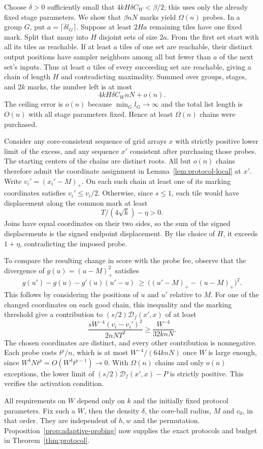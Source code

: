 Choose \(\delta>0\) sufficiently small that
\(4kH\delta C_W<\beta/2\); this uses only the already fixed stage
parameters. We show that \(\beta nN\) marks yield \(\Omega(n)\) probes.
In a group \(G\), put \(a=\lceil\delta l_G\rceil\). Suppose at least
\(2Ha\) remaining tiles have one fixed mark. Split that many into \(H\)
disjoint sets of size \(2a\). From the first set start with all its
tiles as reachable. If at least \(a\) tiles of one set are reachable,
their distinct output positions have sampler neighbors among all but
fewer than \(a\) of the next set's inputs. Thus at least \(a\) tiles of
every succeeding set are reachable, giving a chain of length \(H\)
and contradicting maximality. Summed over groups, stages, and \(2k\) marks,
the number left is at most
\[
                 4kH\delta C_W nN+o(n).
\]
The ceiling error is \(o(n)\) because \(\min_G l_G\to\infty\) and the total
list length is \(O(n)\) with all stage parameters fixed. Hence at least
\(\Omega(n)\) chains were purchased.

Consider any core-consistent sequence of grid arrays \(x\) with strictly
positive lower limit of the excess, and any sequence \(x'\) consistent
after purchasing those probes. The starting centers of the chains are
distinct roots. All but \(o(n)\) chains therefore admit the coordinate
assignment in Lemma~\ref{lem:protocol-local} at \(x'\). Write
\(v_i'=(x_i'-M)_+\). On each such chain at least one of its marking
coordinates satisfies \(v_i'\le v_i/2\). Otherwise, since \(s\le1\), each
tile would have displacement along the common mark at least
\[
                    T/(4\sqrt{k})-\eta>0 .
\]
Joins have equal coordinates on their two sides, so the sum of the
signed displacements is the signed endpoint displacement. By the choice of \(H\), it exceeds \(1+\eta\), contradicting the imposed probe.

To compare the resulting change in score with the probe fee, observe
that the divergence of $g(u)=(u-M)_+^2$ satisfies
\[
 g(u')-g(u)-g'(u)(u'-u)
        \ \ge\ \big((u'-M)_+-(u-M)_+\big)^2.
\]
This follows by considering the positions of $u$ and $u'$ relative to $M$.
For one of the changed coordinates on each good chain, this inequality
and the marking threshold give a contribution to
\((s/2)\mathcal D_f(x',x)\) of at least
\[
      \frac{sW^{-4}(v_i-v_i')^2}{2nNT^2}
                \ge \frac{W^{-4}}{32k nN}.
\]
The chosen coordinates are distinct, and every other contribution is
nonnegative. Each probe costs \( t^p/n\), which is at most
\(W^{-4}/(64k nN)\) once \(W\) is large enough, since
\(W^4 N t^p=O(W^4t^{p-1})\to0\). With \(\Omega(n)\) chains and only \(o(n)\)
exceptions, the lower limit of \((s/2)\mathcal D_f(x',x)-P\) is strictly
positive. This verifies the activation condition.

All requirements on \(W\) depend only on \(k\) and the initially fixed
protocol parameters. Fix such a \(W\), then the density \(\delta\), the
core-ball radius, \(M\) and \(c_0\), in that order. They are independent
of \(h,w\) and the permutation. Proposition~\ref{prop:adaptive-probing}
now supplies the exact protocols and budget in
Theorem~\ref{thm:protocol}.
